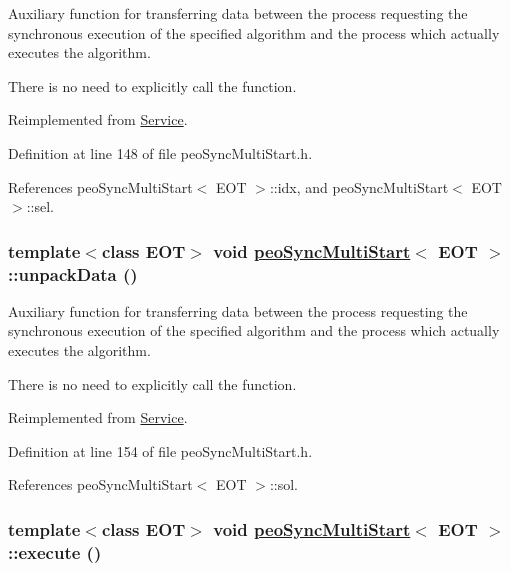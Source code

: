 Auxiliary function for transferring data between the process requesting the synchronous execution of the specified algorithm and the process which actually executes the algorithm. 

There is no need to explicitly call the function. 

Reimplemented from \hyperlink{classService_aea4b8f7f8fb88e83862ee4bfd9ab207}{Service}.

Definition at line 148 of file peo\-Sync\-Multi\-Start.h.

References peo\-Sync\-Multi\-Start$<$ EOT $>$::idx, and peo\-Sync\-Multi\-Start$<$ EOT $>$::sel.\hypertarget{classpeoSyncMultiStart_2903a441b77cded266b5fb651e17a5b5}{
\subsubsection[unpackData]{\setlength{\rightskip}{0pt plus 5cm}template$<$class EOT$>$ void \hyperlink{classpeoSyncMultiStart}{peo\-Sync\-Multi\-Start}$<$ EOT $>$::unpack\-Data ()}}
\label{classpeoSyncMultiStart_2903a441b77cded266b5fb651e17a5b5}


Auxiliary function for transferring data between the process requesting the synchronous execution of the specified algorithm and the process which actually executes the algorithm. 

There is no need to explicitly call the function. 

Reimplemented from \hyperlink{classService_3bd87b444710813d30fd754d4d0b4df3}{Service}.

Definition at line 154 of file peo\-Sync\-Multi\-Start.h.

References peo\-Sync\-Multi\-Start$<$ EOT $>$::sol.\hypertarget{classpeoSyncMultiStart_a4d1c2943c290de540800087b54dc49b}{
\subsubsection[execute]{\setlength{\rightskip}{0pt plus 5cm}template$<$class EOT$>$ void \hyperlink{classpeoSyncMultiStart}{peo\-Sync\-Multi\-Start}$<$ EOT $>$::execute ()}}
\label{classpeoSyncMultiStart_a4d1c2943c290de540800087b54dc49b}


